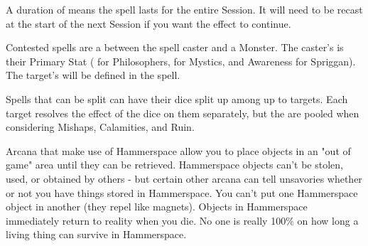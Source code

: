 {\begin{multicols}{2}
{    \item A duration of  means the spell lasts for the entire Session.  It will need to be recast at the start of the next Session if you want the effect to continue.
  }



  Contested spells are a \RB between the spell caster and a Monster.  The caster's \RB is their Primary Stat ( \INT for Philosophers, \FOC for Mystics, and Awareness for Spriggan).  The target's \RB will be defined in the spell.  


  Spells that can be split can have their dice split up among up to \DICE targets.  Each target resolves the effect of the dice on them separately, but the \DICE are pooled when considering Mishaps, Calamities, and Ruin.


 \newpage


  Arcana that make use of Hammerspace allow you to place objects in an "out of game" area until they can be retrieved.  Hammerspace objects can't be stolen, used, or obtained by others - but certain other arcana can tell unsavories whether or not you have things stored in Hammerspace.  You can't put one Hammerspace object in another (they repel like magnets). Objects in Hammerspace immediately return to reality when you die.  No one is really 100\% on how long a living thing can survive in Hammerspace.  


\end{multicols}}
